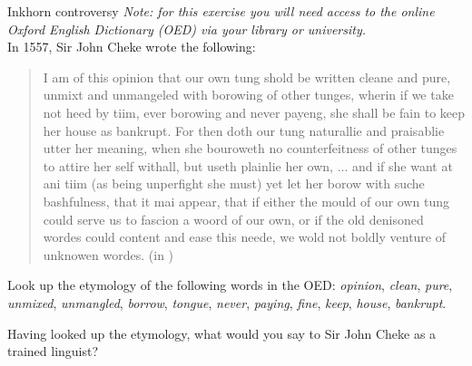 \begin{exercises}{Inkhorn controversy}\label{EModE-inkhorn-exercise}
\emph{Note: for this exercise you will need access to the online Oxford English Dictionary (OED) via your library or university.}\\

\noindent In 1557, Sir John Cheke wrote the following:
 
\begin{quote}
    I am of this opinion that our own tung shold be written cleane and pure, unmixt and unmangeled with borowing of other tunges, wherin if we take not heed by tiim, ever borowing and never payeng, she shall be fain to keep her house as bankrupt. For then doth our tung naturallie and praisablie utter her meaning, when she bouroweth no counterfeitness of other tunges to attire her self withall, but useth plainlie her own, ... and if she want at ani tiim (as being unperfight she must) yet let her borow with suche bashfulness, that it mai appear, that if either the mould of our own tung could serve us to fascion a woord of our own, or if the old denisoned wordes could content and ease this neede, we wold not boldly venture of unknowen wordes. (in \citealp[31]{Wells1973})
\end{quote}
		
\noindent Look up the etymology of the following words in the OED: \textit{opinion}, \textit{clean}, \textit{pure}, \textit{unmixed}, \textit{unmangled}, \textit{borrow}, \textit{tongue}, \textit{never}, \textit{paying}, \textit{fine}, \textit{keep}, \textit{house}, \textit{bankrupt}.

Having looked up the etymology, what would you say to Sir John Cheke as a trained linguist?

\end{exercises}

